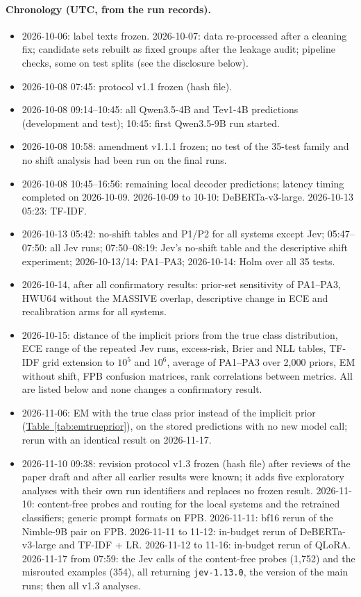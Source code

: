\paragraph{Chronology (UTC, from the run records).}
\begin{itemize}
  \item 2026-10-06: label texts frozen. 2026-10-07: data re-processed after a cleaning fix; candidate sets rebuilt as
  fixed groups after the leakage audit; pipeline checks, some on test splits (see the disclosure below).
  \item 2026-10-08 07:45: protocol v1.1 frozen (hash file).
  \item 2026-10-08 09:14--10:45: all Qwen3.5-4B and Tev1-4B predictions (development and test); 10:45: first
  Qwen3.5-9B run started.
  \item 2026-10-08 10:58: amendment v1.1.1 frozen; no test of the 35-test family and no shift analysis had been run
  on the final runs.
  \item 2026-10-08 10:45--16:56: remaining local decoder predictions; latency timing completed on 2026-10-09.
  2026-10-09 to 10-10: DeBERTa-v3-large. 2026-10-13 05:23: TF-IDF.
  \item 2026-10-13 05:42: no-shift tables and P1/P2 for all systems except Jev; 05:47--07:50: all Jev runs;
  07:50--08:19: Jev's no-shift table and the descriptive shift experiment; 2026-10-13/14: PA1--PA3; 2026-10-14: Holm
  over all 35 tests.
  \item 2026-10-14, after all confirmatory results: prior-set sensitivity of PA1--PA3, HWU64 without the MASSIVE
  overlap, descriptive change in ECE and recalibration arms for all systems.
  \item 2026-10-15: distance of the implicit priors from the true class distribution, ECE range of the repeated Jev
  runs, excess-risk, Brier and NLL tables, TF-IDF grid extension to $10^5$ and $10^6$, average of PA1--PA3 over 2{,}000 priors, EM without
  shift, FPB confusion matrices, rank correlations between metrics. All are listed below and none changes a
  confirmatory result.
  \item 2026-11-06: EM with the true class prior instead of the implicit prior
  (\hyperref[tab:emtrueprior]{Table~\ref*{tab:emtrueprior}}), on the stored predictions with no new model call; rerun
  with an identical result on 2026-11-17.
  \item 2026-11-10 09:38: revision protocol v1.3 frozen (hash file) after reviews of the paper draft and after all
  earlier results were known; it adds five exploratory analyses with their own run identifiers and replaces no frozen
  result. 2026-11-10: content-free probes and routing for the local systems and the retrained classifiers; generic
  prompt formats on FPB. 2026-11-11: bf16 rerun of the Nimble-9B pair on FPB. 2026-11-11 to 11-12: in-budget rerun of
  DeBERTa-v3-large and TF-IDF + LR. 2026-11-12 to 11-16: in-budget rerun of QLoRA. 2026-11-17 from 07:59: the Jev
  calls of the content-free probes (1{,}752) and the misrouted examples (354), all returning \texttt{jev-1.13.0}, the
  version of the main runs; then all v1.3 analyses.
\end{itemize}

